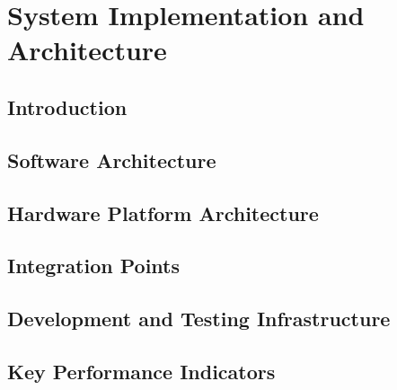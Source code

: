 \chapter{System Implementation and Architecture}

\section{Introduction}

\section{Software Architecture}

\section{Hardware Platform Architecture}

\section{Integration Points}

\section{Development and Testing Infrastructure}

\section{Key Performance Indicators}
